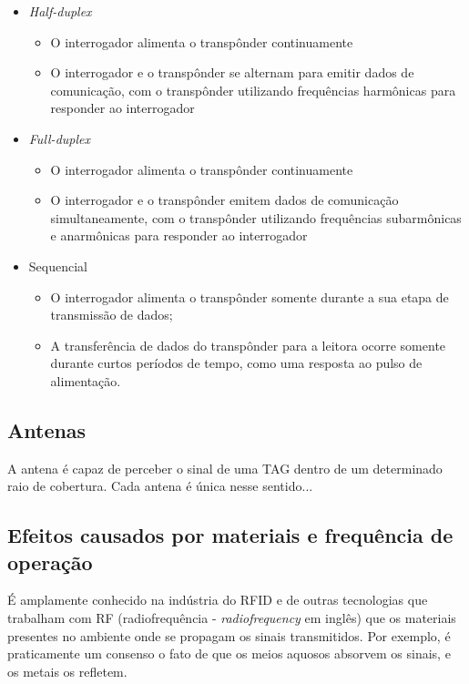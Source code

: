\begin{itemize}
    \item \textit{Half-duplex}
    \begin{itemize}
        \item O interrogador alimenta o transpônder continuamente
        \item O interrogador e o transpônder se alternam para emitir dados de comunicação, com o transpônder utilizando frequências harmônicas para responder ao interrogador
    \end{itemize}
    \item \textit{Full-duplex}
    \begin{itemize}
        \item O interrogador alimenta o transpônder continuamente
        \item O interrogador e o transpônder emitem dados de comunicação simultaneamente, com o transpônder utilizando frequências subarmônicas e anarmônicas para responder ao interrogador
    \end{itemize}
    \item Sequencial
    \begin{itemize}
        \item O interrogador alimenta o transpônder somente durante a sua etapa de transmissão de dados;
        \item A transferência de dados do transpônder para a leitora ocorre somente durante curtos períodos de tempo, como uma resposta ao pulso de alimentação.
    \end{itemize}
\end{itemize}




\subsection{Antenas}

A antena é capaz de perceber o sinal de uma TAG dentro de um determinado raio de cobertura. Cada antena é única nesse sentido...


\subsection{Efeitos causados por materiais e frequência de operação}

É amplamente conhecido na indústria do RFID e de outras tecnologias que trabalham com RF (radiofrequência - \textit{radiofrequency} em inglês) que os materiais presentes no ambiente onde se propagam os sinais transmitidos. Por exemplo, é praticamente um consenso o fato de que os meios aquosos absorvem os sinais, e os metais os refletem.

